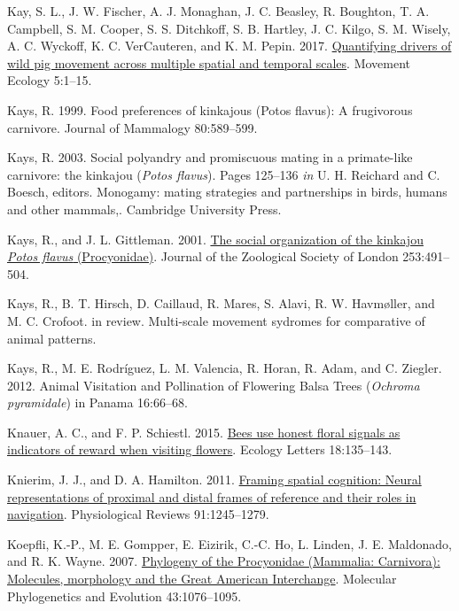 \documentclass[twoside,12pt,final]{ucthesis-CA2012}
\newenvironment{CSLReferences}%
  {}%
  {\par}
\begin{document}
\begin{ucmainmatter}
\begin{CSLReferences}{1}{0}
\leavevmode{}%
Kay, S. L., J. W. Fischer, A. J. Monaghan, J. C. Beasley, R. Boughton, T. A. Campbell, S. M. Cooper, S. S. Ditchkoff, S. B. Hartley, J. C. Kilgo, S. M. Wisely, A. C. Wyckoff, K. C. VerCauteren, and K. M. Pepin. 2017. \href{https://doi.org/10.1186/s40462-017-0105-1}{Quantifying drivers of wild pig movement across multiple spatial and temporal scales}. Movement Ecology 5:1--15.

\leavevmode{}%
Kays, R. 1999. Food preferences of kinkajous (Potos flavus): A frugivorous carnivore. Journal of Mammalogy 80:589--599.

\leavevmode{}%
Kays, R. 2003. Social polyandry and promiscuous mating in a primate-like carnivore: the kinkajou (\emph{Potos flavus}). Pages 125--136 \emph{in} U. H. Reichard and C. Boesch, editors. Monogamy: mating strategies and partnerships in birds, humans and other mammals,. Cambridge University Press.

\leavevmode{}%
Kays, R., and J. L. Gittleman. 2001. \href{https://doi.org/10.1017/S0952836901000450}{The social organization of the kinkajou \emph{Potos flavus} (Procyonidae)}. Journal of the Zoological Society of London 253:491--504.

\leavevmode{}%
Kays, R., B. T. Hirsch, D. Caillaud, R. Mares, S. Alavi, R. W. Havmøller, and M. C. Crofoot. in review. Multi-scale movement sydromes for comparative of animal patterns.

\leavevmode{}%
Kays, R., M. E. Rodríguez, L. M. Valencia, R. Horan, R. Adam, and C. Ziegler. 2012. Animal Visitation and Pollination of Flowering Balsa Trees (\emph{Ochroma pyramidale}) in Panama 16:66--68.

\leavevmode{}%
Knauer, A. C., and F. P. Schiestl. 2015. \href{https://doi.org/10.1111/ele.12386}{Bees use honest floral signals as indicators of reward when visiting flowers}. Ecology Letters 18:135--143.

\leavevmode{}%
Knierim, J. J., and D. A. Hamilton. 2011. \href{https://doi.org/10.1152/physrev.00021.2010}{Framing spatial cognition: Neural representations of proximal and distal frames of reference and their roles in navigation}. Physiological Reviews 91:1245--1279.

\leavevmode{}%
Koepfli, K.-P., M. E. Gompper, E. Eizirik, C.-C. Ho, L. Linden, J. E. Maldonado, and R. K. Wayne. 2007. \href{https://doi.org/10.1016/j.ympev.2006.10.003}{Phylogeny of the Procyonidae (Mammalia: Carnivora): Molecules, morphology and the Great American Interchange}. Molecular Phylogenetics and Evolution 43:1076--1095.


\end{CSLReferences}
\end{ucmainmatter}
\end{document}
